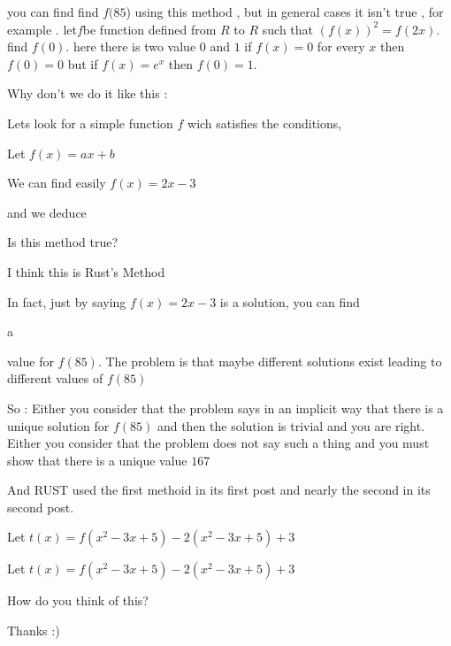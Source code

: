 \begin{mysolution}
	you can find find $ f(85$) using this method , but in general cases it isn't true , for example .
let$ f$be function defined from $ R$ to $ R$ such that $ (f(x))^2= f(2x)$. find $ f(0)$.
here there is two value $ 0$ and $ 1$ if $ f(x)=0$ for every $ x$ then $ f(0)=0$ but if $ f(x)=e^x$ then $ f(0)=1$.
\end{mysolution}



\begin{mysolution}
	\begin{tcolorbox}Why don't we do it like this :

Lets look for a simple function $ f$ wich satisfies the conditions,

Let $ f(x) = ax + b$

We can find easily $ f(x) = 2x - 3$
 
and we deduce

Is this method true?

I think this is Rust's Method\end{tcolorbox}

In fact, just by saying $ f(x)=2x-3$ is a solution, you can find \begin{bolded}\begin{underlined}a\end{underlined}\end{bolded} value for $ f(85)$.
The problem is that maybe different solutions exist leading to different values of $ f(85)$

So :
Either you consider that the problem says in an implicit way that there is a unique solution for $ f(85)$ and then the solution is trivial and you are right.
Either you consider that the problem does not say such a thing and you must show that there is a unique value $ 167$

And RUST used the first methoid in its first post
and nearly the second in its second post.
\end{mysolution}



\begin{mysolution}
	\begin{tcolorbox}Let $ t(x) = f(x^2 - 3x + 5) - 2(x^2 - 3x + 5) + 3$\end{tcolorbox}

\begin{tcolorbox}
Let $ t(x) = f(x^2 - 3x + 5) - 2(x^2 - 3x + 5) + 3$
\end{tcolorbox}

How do you think of this?

Thanks  :)
\end{mysolution}




